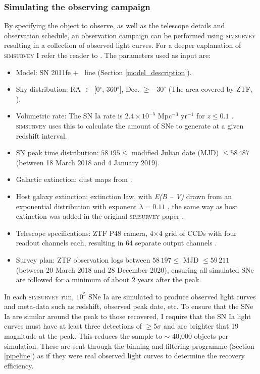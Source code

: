 \documentclass[a4paper,oneside,12pt, class=Latex/Classes/PhDthesisPSnPDF, crop=false]{standalone}
\begin{document}
\subsubsection{Simulating the observing campaign}
\label{sim_obs}
By specifying the object to observe, as well as the telescope details and observation schedule, an observation campaign can be performed using \textsc{simsurvey} resulting in a collection of observed light curves. For a deeper explanation of \textsc{simsurvey} I refer the reader to \cite{simsurvey_main}. The parameters used as input are:

\begin{itemize}
 \item Model: SN 2011fe + \Halpha~line (Section \ref{model_description}).
 \item Sky distribution: RA $\in$ [0$^{\circ}$, 360$^{\circ}$], Dec. $\geq -30^{\circ}$ (The area covered by ZTF, \citealt{ZTF_Surveys_Scheduler}).
 \item Volumetric rate: The SN Ia rate is $2.4\times10^{-5}$ Mpc$^{-3}$ yr$^{-1}$ for $z \leq 0.1$ \citep{SNIa_rate}. \textsc{simsurvey} uses this to calculate the amount of SNe to generate at a given redshift interval.
 \item SN peak time distribution: $58\,195 \leq$ modified Julian date (MJD) $\leq 58\,487$ (between 18 March 2018 and 4 January 2019).
 \item Galactic extinction: dust maps from \citet{SFD98_dust_maps}.
 \item Host galaxy extinction: \citet{ccm89_extinction_law} extinction law, with \textit{E(B -- V)} drawn from an exponential distribution with exponent $\lambda=0.11$ \citep{EBV_simsurvey}, the same way as host extinction was added in the original \textsc{simsurvey} paper \citep{simsurvey_main}.
 \item Telescope specifications: ZTF P48 camera, 4$\times$4 grid of CCDs with four readout channels each, resulting in 64 separate output channels \citep{ZTF_Observing_System}.
 \item Survey plan: ZTF observation logs between $58\,197\leq$ MJD $\leq 59\,211$ (between 20 March 2018 and 28 December 2020), ensuring all simulated SNe are followed for a minimum of about 2 years after the peak.
\end{itemize}

In each \textsc{simsurvey} run, $10^5$ SNe Ia are simulated to produce observed light curves and meta-data such as redshift, observed peak date, etc. To ensure that the SNe Ia are similar around the peak to those recovered, I require that the SN Ia light curves must have at least three detections of $\geq$5$\sigma$ and are brighter that 19 magnitude at the peak. This reduces the sample to $\sim$ 40,000 objects per simulation. These are sent through the binning and filtering programme (Section \ref{pipeline}) as if they were real observed light curves to determine the recovery efficiency. 
\end{document}
